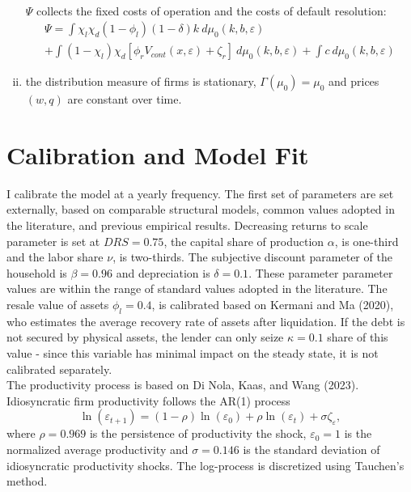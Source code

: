 \documentclass[12pt]{article}
\begin{document}
\begin{enumerate}[(i)]
\begin{multline*}
\end{multline*}
$\Psi$ collects the fixed costs of operation and the costs of default resolution:
\begin{multline*} 
    \Psi = \int  \chi_l \chi_d (1-\phi_l) (1-\delta)k \ d \mu_0 (k,b,\varepsilon)  \\ + \int  (1 - \chi_l)  \chi_d [\phi_r V_{cont}(x, \varepsilon) + \zeta_r] \ d \mu_0 (k,b,\varepsilon) + \int  c \ d \mu_0 (k,b,\varepsilon) 
\end{multline*}
\item the distribution measure of firms is stationary, $\Gamma(\mu_0) = \mu_0$ and prices $(w,q)$ are constant over time.
\end{enumerate}


\section{Calibration and Model Fit}
I calibrate the model at a yearly frequency. The first set of parameters are set externally, based on comparable structural models, common values adopted in the literature, and previous empirical results. Decreasing returns to scale parameter is set at $DRS = 0.75$, the capital share of production $\alpha$, is one-third and the labor share $\nu$, is two-thirds. The subjective discount parameter of the household is $\beta = 0.96$ and depreciation is $\delta = 0.1$. These parameter parameter values are within the range of standard values adopted in the literature. The resale value of assets $\phi_l = 0.4$, is calibrated based on Kermani and Ma (2020), who estimates the average recovery rate of assets after liquidation. If the debt is not secured by physical assets, the lender can only seize $\kappa = 0.1$ share of this value - since this variable has minimal impact on the steady state, it is not calibrated separately. \vspace{3mm} \\
The productivity process is based on Di Nola, Kaas, and Wang (2023). Idiosyncratic firm productivity follows the AR(1) process 
$$ \ln(\varepsilon_{t+1}) = (1-\rho) \ln(\varepsilon_0) + \rho \ln(\varepsilon_t) + \sigma \zeta_\varepsilon, $$ where 
$\rho = 0.969$ is the persistence of productivity the shock, $\varepsilon_0 = 1$ is the normalized average productivity and $\sigma = 0.146$ is the standard deviation of idiosyncratic productivity shocks. The log-process is discretized using Tauchen's method. \vspace{3mm} \\
\end{document}

